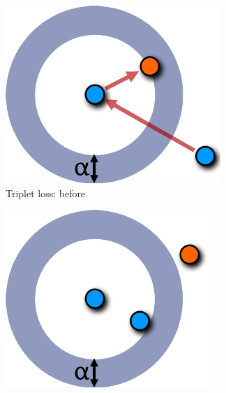 \begin{figure}[h]
  \centering
  \begin{subfigure}[b]{0.245\textwidth}
    \centering
    \includegraphics[width=\textwidth]{images/triplet-magnet-difference/triplet_before.pdf}
    \caption{Triplet loss: before}
  \end{subfigure}
  \hfill
  \begin{subfigure}[b]{0.245\textwidth}
    \centering
    \includegraphics[width=\textwidth]{images/triplet-magnet-difference/triplet_after.pdf}

\end{subfigure}
\end{figure}
